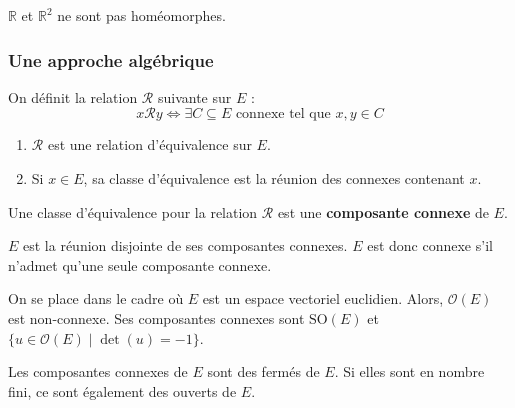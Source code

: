   \begin{application}
    $\mathbb{R}$ et $\mathbb{R}^2$ ne sont pas homéomorphes.
  \end{application}

  \subsubsection{Une approche algébrique}

  \begin{definition}
    On définit la relation $\mathcal{R}$ suivante sur $E$ :
    \[ x \mathcal{R} y \iff \exists C \subseteq E \text{ connexe tel que } x, y \in C \]
  \end{definition}

  \begin{proposition}
    \begin{enumerate}[label={\bfseries(\roman*)}]
      \item $\mathcal{R}$ est une relation d'équivalence sur $E$.
      \item Si $x \in E$, sa classe d'équivalence est la réunion des connexes contenant $x$.
    \end{enumerate}
  \end{proposition}

  \begin{definition}
    Une classe d'équivalence pour la relation $\mathcal{R}$ est une \textbf{composante connexe} de $E$.
  \end{definition}

  \begin{remark}
    $E$ est la réunion disjointe de ses composantes connexes. $E$ est donc connexe s'il n'admet qu'une seule composante connexe.
  \end{remark}


  \begin{example}
    On se place dans le cadre où $E$ est un espace vectoriel euclidien. Alors, $\mathcal{O}(E)$ est non-connexe. Ses composantes connexes sont $\mathrm{SO}(E)$ et $\{ u \in \mathcal{O}(E) \mid \det(u) = -1 \}$.
  \end{example}


  \begin{proposition}
    Les composantes connexes de $E$ sont des fermés de $E$. Si elles sont en nombre fini, ce sont également des ouverts de $E$.
  \end{proposition}

